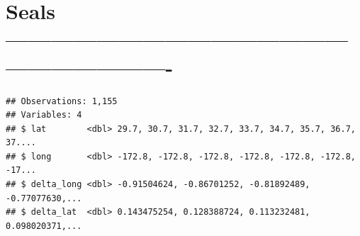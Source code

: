 \documentclass[]{article}
\newenvironment{Shaded}{\begin{snugshade}}{\end{snugshade}}
\newcommand{\DataTypeTok}[1]{\textcolor[rgb]{0.13,0.29,0.53}{#1}}
\newcommand{\DecValTok}[1]{\textcolor[rgb]{0.00,0.00,0.81}{#1}}
\newcommand{\FloatTok}[1]{\textcolor[rgb]{0.00,0.00,0.81}{#1}}
\newcommand{\KeywordTok}[1]{\textcolor[rgb]{0.13,0.29,0.53}{\textbf{#1}}}
\newcommand{\NormalTok}[1]{#1}
\newcommand{\OperatorTok}[1]{\textcolor[rgb]{0.81,0.36,0.00}{\textbf{#1}}}
\newcommand{\StringTok}[1]{\textcolor[rgb]{0.31,0.60,0.02}{#1}}
\begin{document}
\hypertarget{seals--}{%
\section{Seals
-------------------------------------------------------------------}\label{seals--}}

\begin{Shaded}
\end{Shaded}

\begin{verbatim}
## Observations: 1,155
## Variables: 4
## $ lat        <dbl> 29.7, 30.7, 31.7, 32.7, 33.7, 34.7, 35.7, 36.7, 37....
## $ long       <dbl> -172.8, -172.8, -172.8, -172.8, -172.8, -172.8, -17...
## $ delta_long <dbl> -0.91504624, -0.86701252, -0.81892489, -0.77077630,...
## $ delta_lat  <dbl> 0.143475254, 0.128388724, 0.113232481, 0.098020371,...
\end{verbatim}

\begin{Shaded}
\end{Shaded}
\end{document}
